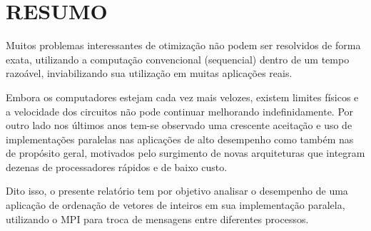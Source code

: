 \section{\normalsize RESUMO}
	Muitos problemas interessantes de otimização não podem ser resolvidos de forma exata, utilizando a computação convencional (sequencial) dentro de um tempo razoável, inviabilizando sua utilização em muitas aplicações reais. 
	
	Embora os computadores estejam cada vez mais velozes, existem limites físicos e a velocidade dos circuitos não pode continuar melhorando indefinidamente. Por outro lado nos últimos anos tem-se observado uma crescente aceitação e uso de implementações paralelas nas aplicações de alto desempenho como também nas de propósito geral, motivados pelo surgimento de novas arquiteturas que integram dezenas de processadores rápidos e de baixo custo. 
	
	Dito isso, o presente relatório tem por objetivo analisar o desempenho de uma aplicação de ordenação de vetores de inteiros em sua implementação paralela, utilizando o MPI para troca de mensagens entre diferentes processos.